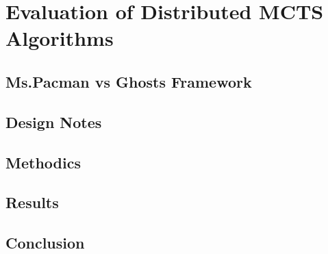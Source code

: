\chapter{Evaluation of Distributed MCTS Algorithms}

\section{Ms.Pacman vs Ghosts Framework}

\section{Design Notes}

\section{Methodics}

\section{Results}

\section{Conclusion}
